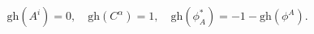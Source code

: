 \begin{equation*}
\mathrm{gh}(A^{i})=0,\quad \mathrm{gh}(C^{\alpha })=1,\quad \mathrm{gh}(\phi
_{A}^{\ast })=-1-\mathrm{gh}(\phi ^{A}).
\end{equation*}

